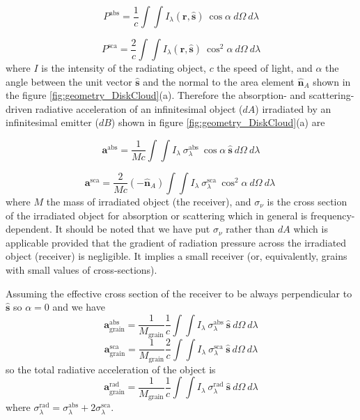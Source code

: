 \documentclass[twocolumn]{aastex62}
\begin{document}
\begin{equation}
P^{\mathrm{abs}} = \frac{1}{c} \int\int I_{\lambda}(\textbf{r}, \hat{\textbf{s}})\ \cos\alpha\ d\Omega\ d\lambda
\end{equation}

\begin{equation}
P^{\mathrm{sca}} = \frac{2}{c} \int\int I_{\lambda}(\textbf{r}, \hat{\textbf{s}})\ \cos^2\alpha\ d\Omega\ d\lambda
\end{equation}
where $I$ is the intensity of the radiating object, $c$ the speed of light, and $\alpha$ the angle between the unit vector $\hat{\textbf{s}}$ and the normal to the area element $\hat{\textbf{n}}_{A}$ shown in the figure \ref{fig:geometry_DiskCloud}(a). Therefore the absorption- and scattering-driven radiative acceleration of an infinitesimal object ($dA$) irradiated by an infinitesimal emitter ($dB$) shown in figure \ref{fig:geometry_DiskCloud}(a) are

\begin{equation}
\textbf{a}^{\mathrm{abs}} = \frac{1}{M c} \int\int I_{\lambda}\ \sigma_{\lambda}^{\mathrm{abs}}\ \cos\alpha\ \hat{\textbf{s}}\ d\Omega\ d\lambda
\end{equation}

\begin{equation}
\textbf{a}^{\mathrm{sca}} = \frac{2}{M c} (-\hat{\textbf{n}}_{A})
\int\int I_{\lambda}\ \sigma_{\lambda}^{\mathrm{sca}}\ \cos^2\alpha\ d\Omega\ d\lambda\ 
\end{equation}
where $M$ the mass of irradiated object (the receiver), and $\sigma_{\nu}$ is the cross section of the irradiated object for absorption or scattering which in general is frequency-dependent. It should be noted that we have put $\sigma_{\nu}$ rather than $dA$ which is applicable provided that the gradient of radiation pressure across the irradiated object (receiver) is negligible. It implies a small receiver (or, equivalently, grains with small values of cross-sections).

Assuming the effective cross section of the receiver to be always perpendicular to $\hat{\textbf{s}}$ so $\alpha=0$ and we have
\begin{equation}
\textbf{a}_{\mathrm{grain}}^{\mathrm{abs}} =
\frac{1}{M_{\mathrm{grain}}}  \frac{1}{c}
\int\int I_{\lambda}\ \sigma_{\lambda}^{\mathrm{abs}}\ \hat{\textbf{s}}\ d\Omega\ d\lambda
\end{equation}
\begin{equation}
\textbf{a}_{\mathrm{grain}}^{\mathrm{sca}} =
\frac{1}{M_{\mathrm{grain}}}  \frac{2}{c}
\int\int I_{\lambda}\ \sigma_{\lambda}^{\mathrm{sca}}\ \hat{\textbf{s}}\ d\Omega\ d\lambda
\end{equation}
so the total radiative acceleration of the object is
\begin{equation}
\textbf{a}_{\mathrm{grain}}^{\mathrm{rad}} =
\frac{1}{M_{\mathrm{grain}}}  \frac{1}{c}
\int\int I_{\lambda}\ \sigma_{\lambda}^{\mathrm{rad}}\ \hat{\textbf{s}}\ d\Omega\ d\lambda
\end{equation}
where
$
\sigma_{\lambda}^{\mathrm{rad}}=
\sigma_{\lambda}^{\mathrm{abs}} + 2 \sigma_{\lambda}^{\mathrm{sca}}
$.
\end{document}
